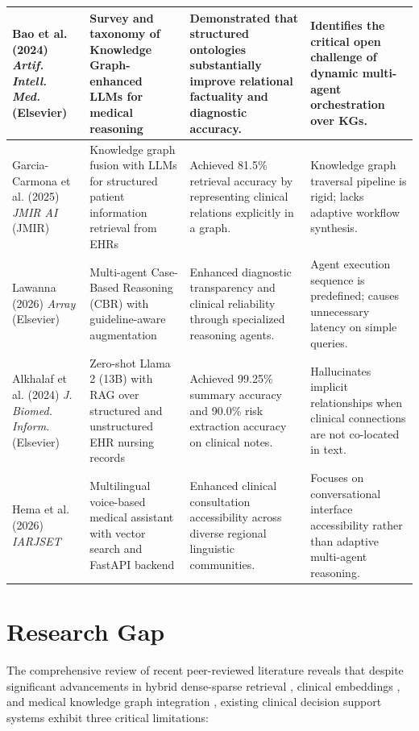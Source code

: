 \documentclass[conference]{IEEEtran}
\begin{document}
\begin{table}[htbp]
\begin{tabularx}{\textwidth}{|p{3.8cm}|X|X|X|}
Bao et al. (2024) \cite{BAO2024102768} \newline \textit{Artif. Intell. Med.} (Elsevier) & Survey and taxonomy of Knowledge Graph-enhanced LLMs for medical reasoning & Demonstrated that structured ontologies substantially improve relational factuality and diagnostic accuracy. & Identifies the critical open challenge of dynamic multi-agent orchestration over KGs. \\ \hline
Garcia-Carmona et al. (2025) \cite{GARCIACARMONA2025} \newline \textit{JMIR AI} (JMIR) & Knowledge graph fusion with LLMs for structured patient information retrieval from EHRs & Achieved 81.5\% retrieval accuracy by representing clinical relations explicitly in a graph. & Knowledge graph traversal pipeline is rigid; lacks adaptive workflow synthesis. \\ \hline
Lawanna (2026) \cite{LAWANNA2026100926} \newline \textit{Array} (Elsevier) & Multi-agent Case-Based Reasoning (CBR) with guideline-aware augmentation & Enhanced diagnostic transparency and clinical reliability through specialized reasoning agents. & Agent execution sequence is predefined; causes unnecessary latency on simple queries. \\ \hline
Alkhalaf et al. (2024) \cite{ALKHALAF2024104662} \newline \textit{J. Biomed. Inform.} (Elsevier) & Zero-shot Llama 2 (13B) with RAG over structured and unstructured EHR nursing records & Achieved 99.25\% summary accuracy and 90.0\% risk extraction accuracy on clinical notes. & Hallucinates implicit relationships when clinical connections are not co-located in text. \\ \hline
Hema et al. (2026) \cite{hema2026voice} \newline \textit{IARJSET} & Multilingual voice-based medical assistant with vector search and FastAPI backend & Enhanced clinical consultation accessibility across diverse regional linguistic communities. & Focuses on conversational interface accessibility rather than adaptive multi-agent reasoning. \\ \hline
\end{tabularx}
\end{table}

\section{Research Gap}

The comprehensive review of recent peer-reviewed literature reveals that despite significant advancements in hybrid dense-sparse retrieval \cite{info17020133,WANG2025100504}, clinical embeddings \cite{ai6100240}, and medical knowledge graph integration \cite{GARCIACARMONA2025,BAO2024102768}, existing clinical decision support systems exhibit three critical limitations:
\end{document}
